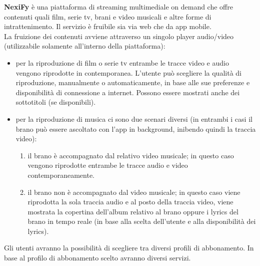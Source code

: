 \textbf{NexiFy} è una piattaforma di streaming multimediale on demand che offre contenuti quali film, serie tv, brani e video musicali e altre forme di intrattenimento. Il servizio è fruibile sia via web che da app mobile.\\

La fruizione dei contenuti avviene attraverso un singolo player audio/video (utilizzabile solamente all'interno della piattaforma):
\begin{itemize}\item per la riproduzione di film o serie tv entrambe le tracce video e audio vengono riprodotte in contemporanea. L’utente può scegliere la qualità di riproduzione, manualmente o automaticamente, in base alle sue preferenze e disponibilità di connessione a internet. Possono essere mostrati anche dei sottotitoli (se disponibili).
    \item per la riproduzione di musica ci sono due scenari diversi (in entrambi i casi il brano può essere ascoltato con l’app in background, inibendo quindi la traccia video):
    \begin{enumerate}
        \item il brano è accompagnato dal relativo video musicale; in questo caso vengono riprodotte entrambe le tracce audio e video contemporaneamente.
        \item il brano non è accompagnato dal video musicale; in questo caso viene riprodotta la sola traccia audio e al posto della traccia video, viene mostrata la copertina dell’album relativo al brano oppure i lyrics del brano in tempo reale (in base alla scelta dell’utente e alla disponibilità dei lyrics).
    \end{enumerate}
\end{itemize}

Gli utenti avranno la possibilità di scegliere tra diversi profili di abbonamento. In base al profilo di abbonamento scelto avranno diversi servizi.\\

